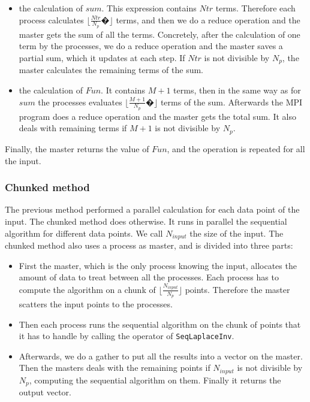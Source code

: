 \documentclass[11pt,a4paper]{article}
\begin{document}
\begin{itemize}

\item the calculation of $sum$. This expression contains $Ntr$ terms. Therefore each process calculates $\lfloor \frac{Ntr}{N_p}�\rfloor$ terms, and then we do a reduce operation and the master gets the sum of all the terms. Concretely, after the calculation of one term by the processes, we do a reduce operation and the master saves a partial sum, which it updates at each step. If $Ntr$ is not divisible by $N_p$, the master calculates the remaining terms of the sum. 

\item the calculation of $Fun$. It contains $M+1$ terms, then in the same way as for $sum$ the processes evaluates $\lfloor \frac{M+1}{N_p}�\rfloor$ terms of the sum. Afterwards the MPI program does  a reduce operation and the master gets the total sum. It also deals with remaining terms if $M+1$ is not divisible by $N_p$.

\end{itemize}

Finally, the master returns the value of $Fun$, and the operation is repeated for all the input. 

\subsubsection{Chunked method}
The previous method performed a parallel calculation for each data point of the input. The chunked method does otherwise. It runs in parallel the sequential algorithm for different data points. We call $N_{input}$ the size of the input. The chunked method also uses a process as master, and is divided into three parts: 

\begin{itemize}

\item First the master, which is the only process knowing the input, allocates the amount of data to treat between all the processes. Each process has to compute the algorithm on a chunk of $\lfloor \frac{N_{input}}{N_p} \rfloor$ points. Therefore the master scatters the input points to the processes. 

\item Then each process runs the sequential algorithm on the chunk of points that it has to handle by calling the operator of \verb_SeqLaplaceInv_. 

\item Afterwards, we do a gather to put all the results into a vector on the master. Then the masters deals with the remaining points if $N_{input}$ is not divisible by $N_p$, computing the sequential algorithm on them. Finally it returns the output vector. 

\end{itemize}
\end{document}

